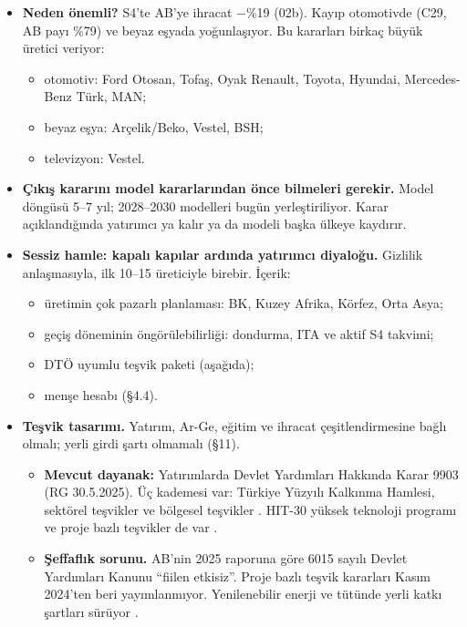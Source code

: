\begin{itemize}
\tightlist
\item
  \textbf{Neden önemli?} S4'te AB'ye ihracat −\%19 (02b). Kayıp otomotivde (C29, AB payı \%79) ve beyaz eşyada yoğunlaşıyor. Bu kararları birkaç büyük üretici veriyor:

  \begin{itemize}
  \tightlist
  \item
    otomotiv: Ford Otosan, Tofaş, Oyak Renault, Toyota, Hyundai, Mercedes-Benz Türk, MAN;
  \item
    beyaz eşya: Arçelik/Beko, Vestel, BSH;
  \item
    televizyon: Vestel.
  \end{itemize}
\item
  \textbf{Çıkış kararını model kararlarından önce bilmeleri gerekir.} Model döngüsü 5--7 yıl; 2028--2030 modelleri bugün yerleştiriliyor. Karar açıklandığında yatırımcı ya kalır ya da modeli başka ülkeye kaydırır.
\item
  \textbf{Sessiz hamle: kapalı kapılar ardında yatırımcı diyaloğu.} Gizlilik anlaşmasıyla, ilk 10--15 üreticiyle birebir. İçerik:

  \begin{itemize}
  \tightlist
  \item
    üretimin çok pazarlı planlaması: BK, Kuzey Afrika, Körfez, Orta Asya;
  \item
    geçiş döneminin öngörülebilirliği: dondurma, ITA ve aktif S4 takvimi;
  \item
    DTÖ uyumlu teşvik paketi (aşağıda);
  \item
    menşe hesabı (§4.4).
  \end{itemize}
\item
  \textbf{Teşvik tasarımı.} Yatırım, Ar-Ge, eğitim ve ihracat çeşitlendirmesine bağlı olmalı; yerli girdi şartı olmamalı (§11).

  \begin{itemize}
  \tightlist
  \item
    \textbf{Mevcut dayanak:} Yatırımlarda Devlet Yardımları Hakkında Karar 9903 (RG 30.5.2025). Üç kademesi var: Türkiye Yüzyılı Kalkınma Hamlesi, sektörel teşvikler ve bölgesel teşvikler \etiketV{}. HIT-30 yüksek teknoloji programı ve proje bazlı teşvikler de var \etiketT{}.
  \item
    \textbf{Şeffaflık sorunu.} AB'nin 2025 raporuna göre 6015 sayılı Devlet Yardımları Kanunu ``fiilen etkisiz''. Proje bazlı teşvik kararları Kasım 2024'ten beri yayımlanmıyor. Yenilenebilir enerji ve tütünde yerli katkı şartları sürüyor \etiketV{}.


\end{itemize}
\end{itemize}
